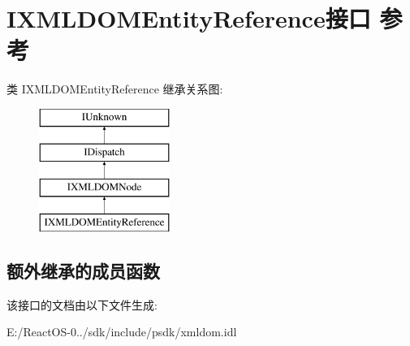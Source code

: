 \hypertarget{interface_i_x_m_l_d_o_m_entity_reference}{}\section{I\+X\+M\+L\+D\+O\+M\+Entity\+Reference接口 参考}
\label{interface_i_x_m_l_d_o_m_entity_reference}
类 I\+X\+M\+L\+D\+O\+M\+Entity\+Reference 继承关系图\+:\begin{figure}[H]
\begin{center}
\leavevmode
\includegraphics[height=4.000000cm]{interface_i_x_m_l_d_o_m_entity_reference}
\end{center}
\end{figure}
\subsection*{额外继承的成员函数}


该接口的文档由以下文件生成\+:\begin{DoxyCompactItemize}
\item 
E\+:/\+React\+O\+S-\/0../sdk/include/psdk/xmldom.\+idl\end{DoxyCompactItemize}
